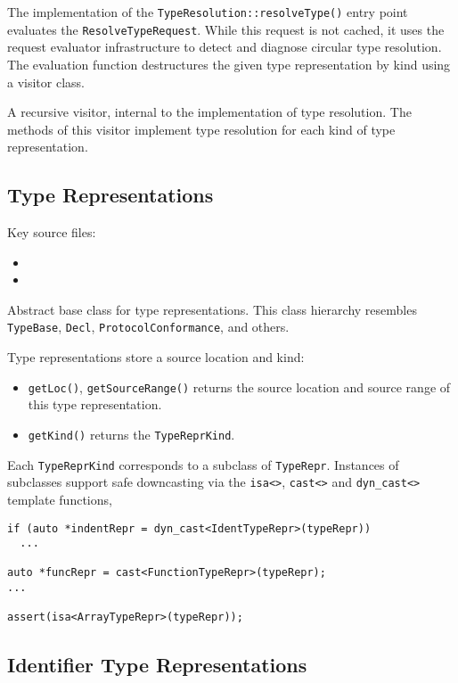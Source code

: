\documentclass[../generics]{subfiles}
\begin{document}
The implementation of the \texttt{TypeResolution::resolveType()} entry point evaluates the \texttt{ResolveTypeRequest}. While this request is not cached, it uses the request evaluator infrastructure to detect and diagnose circular type resolution. The evaluation function destructures the given type representation by kind using a visitor class.

A recursive visitor, internal to the implementation of type resolution. The methods of this visitor implement type resolution for each kind of type representation.

\subsection*{Type Representations}

Key source files:
\begin{itemize}
\item {}
\item {}
\end{itemize}

Abstract base class for type representations. This class hierarchy resembles \texttt{TypeBase}, \texttt{Decl}, \texttt{ProtocolConformance}, and others.

Type representations store a source location and kind:
\begin{itemize}
\item \texttt{getLoc()}, \texttt{getSourceRange()} returns the source location and source range of this type representation.
\item \texttt{getKind()} returns the \texttt{TypeReprKind}.
\end{itemize}
Each \texttt{TypeReprKind} corresponds to a subclass of \texttt{TypeRepr}. Instances of subclasses support safe downcasting via the \verb|isa<>|, \verb|cast<>| and \verb|dyn_cast<>| template functions, 
\begin{Verbatim}
if (auto *indentRepr = dyn_cast<IdentTypeRepr>(typeRepr))
  ...

auto *funcRepr = cast<FunctionTypeRepr>(typeRepr);
...

assert(isa<ArrayTypeRepr>(typeRepr));
\end{Verbatim}

\subsection*{Identifier Type Representations}
\end{document}

